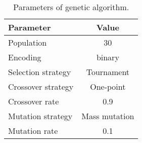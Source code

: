 \renewcommand{\arraystretch}{0.7}
\begin{table}
\centering
\caption{Parameters of genetic algorithm.}
\label{chapter3-tab:ga}
\begin{adjustbox}{width=0.75\textwidth}
\begin{tabular}{lc}
\toprule
Parameter								&  Value  \\
\midrule
Population                              & 30        \\
Encoding								& binary\\
Selection strategy 						& Tournament\\
Crossover strategy			    		& One-point \\
Crossover rate                    		& 0.9 \\
Mutation strategy			    		& Mass mutation \\
Mutation  rate                          & 0.1 \\
\bottomrule
\end{tabular}
\end{adjustbox}
\end{table}
\renewcommand{\arraystretch}{2}
